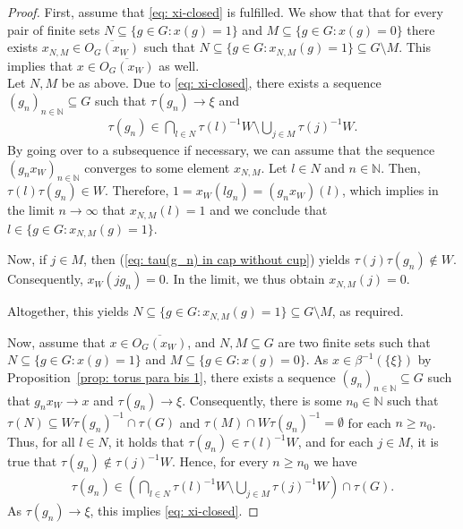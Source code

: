 \documentclass[titlepage,reqno,10pt]{amsart}
\theoremstyle{definition}
\def\N{{\mathbb N}}
\newcommand{\tm}{\subseteq}
\newcommand{\ol}[1]{\overline{#1}}
\begin{document}
\begin{proof}
    First, assume that \eqref{eq: xi-closed} is fulfilled. We show that that for every pair of finite sets $N\subseteq \{g\in G:x(g)=1\}$ and $M\tm \{g\in G:x(g)=0\}$ there exists $x_{N,M}\in\overline{O_G(x_W)}$ such that $N\subseteq \{g\in G:x_{N,M}(g)=1\}\subseteq G\setminus M$. This implies that $x\in \ol{O_G(x_W)}$ as well.\\
    Let $N,M$ be as above. Due to \eqref{eq: xi-closed}, there exists a sequence $(g_n)_{n\in\mathbb{N}}\subseteq G$ such that $\tau(g_n)\to \xi$ and 
    \begin{align}\label{eq: tau(g_n) in cap without cup}
        \tau(g_n)\in \bigcap_{l\in N} {\tau(l)}^{-1}W \setminus \bigcup_{j\in M}  \tau(j)^{-1}W. 
    \end{align}
    By going over to a subsequence if necessary, we can assume that the sequence $(g_n x_W)_{n\in\N}$ converges to some element $x_{N,M}$. Let $l\in N$ and $n\in\mathbb{N}$. 
    Then, $\tau(l)\tau(g_n)\in W$. Therefore, $1=x_W(lg_n)=(g_nx_W)(l)$, which implies in the limit $n\to \infty$ that $x_{N,M}(l)=1$ and we conclude that $l\in \{g\in G:x_{N,M}(g)=1\}$.
    
    Now, if $j\in M$, then (\ref{eq: tau(g_n) in cap without cup}) yields $\tau(j)\tau(g_n)\notin W$.
    Consequently, $x_W(jg_n)=0$.
    In the limit, we thus obtain $x_{N,M}(j)=0$. 
    
    Altogether, this yields $N\subseteq \{g\in G:x_{N,M}(g)=1\}\subseteq G\setminus M$, as required.\smallskip

    Now, assume that $x\in \overline{O_G(x_W)}$,  and $N,M\subseteq G$ are two finite sets such that $N\subseteq \{g\in G: x(g)=1\}$ and $M\subseteq \{g\in G: x(g)=0\}$.
    As $x\in\beta^{-1}(\{\xi\})$ by Proposition~\ref{prop: torus para bis 1}, there exists a sequence $(g_n)_{n\in\mathbb{N}}\subseteq G$ such that $g_nx_W\to x$ and $\tau(g_n)\to \xi$.
    Consequently, there is some $n_0\in\mathbb{N}$ such that $\tau(N)\subseteq W\tau(g_n)^{-1}\cap \tau(G)$ and $\tau(M)\cap W\tau(g_n)^{-1}=\emptyset$ for each $n\geq n_0$.
    Thus, for all $l\in N$, it holds that $\tau(g_n)\in \tau(l)^{-1}W$, and for each $j\in M$, it is true that $\tau(g_n)\notin \tau(j)^{-1}W$.
    Hence, for every $n\geq n_0$ we have 
    \begin{align*}
        \tau(g_n)\in \left(\bigcap_{l\in N}\tau(l)^{-1}W\setminus \bigcup_{j\in M}\tau(j)^{-1}W\right)\cap \tau(G).
    \end{align*}
    As $\tau(g_n)\to\xi$, this implies \eqref{eq: xi-closed}.
\end{proof}
\end{document}
